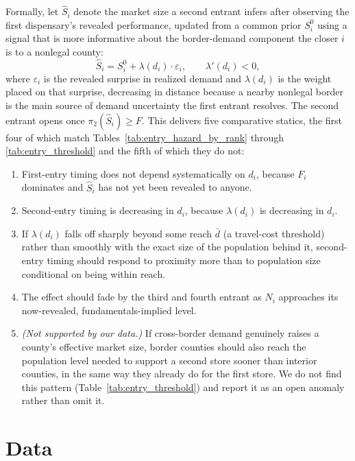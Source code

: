 \documentclass[12pt]{article}
\begin{document}
Formally, let $\hat{S}_i$ denote the market size a second entrant infers after observing the first
dispensary's revealed performance, updated from a common prior $S_i^0$ using a signal that is more
informative about the border-demand component the closer $i$ is to a nonlegal county:
\begin{equation}
\hat{S}_i = S_i^0 + \lambda(d_i) \cdot \varepsilon_i, \qquad \lambda'(d_i) < 0,
\end{equation}
where $\varepsilon_i$ is the revealed surprise in realized demand and $\lambda(d_i)$ is the weight placed on
that surprise, decreasing in distance because a nearby nonlegal border is the main source of demand
uncertainty the first entrant resolves. The second entrant opens once $\pi_2(\hat{S}_i) \geq F$. This
delivers five comparative statics, the first four of which match Tables~\ref{tab:entry_hazard_by_rank}
through \ref{tab:entry_threshold} and the fifth of which they do not:
\begin{enumerate}
  \item First-entry timing does not depend systematically on $d_i$, because $F_i$ dominates and $\hat{S}_i$
        has not yet been revealed to anyone.
  \item Second-entry timing is decreasing in $d_i$, because $\lambda(d_i)$ is decreasing in $d_i$.
  \item If $\lambda(d_i)$ falls off sharply beyond some reach $\bar{d}$ (a travel-cost threshold) rather than
        smoothly with the exact size of the population behind it, second-entry timing should respond to
        proximity more than to population size conditional on being within reach.
  \item The effect should fade by the third and fourth entrant as $N_i$ approaches its now-revealed,
        fundamentals-implied level.
  \item \emph{(Not supported by our data.)} If cross-border demand genuinely raises a county's effective
        market size, border counties should also reach the population level needed to support a second
        store sooner than interior counties, in the same way they already do for the first store. We do not
        find this pattern (Table~\ref{tab:entry_threshold}) and report it as an open anomaly rather than
        omit it.
\end{enumerate}

\section{Data}
\label{sec:data}
\end{document}
